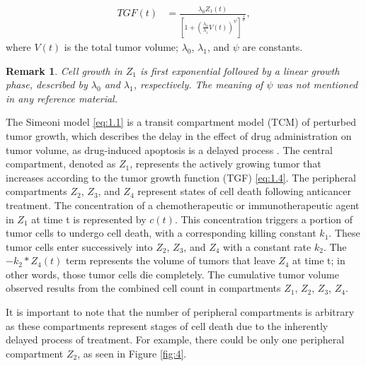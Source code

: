 \documentclass[11pt,reqno]{amsart}
\newtheorem*{remark}{Remark}
\begin{document}
\begin{equation} \label{eq:1.2}
\begin{aligned}
    TGF(t) &= \frac{\lambda_0Z_1(t)}{[1 + (\frac{\lambda_0}{\lambda_1}V(t))^\psi]^\frac{1}{\psi}}, 
\end{aligned}
\tag*{(1.2)}
\end{equation}
\qquad where $V(t)$ is the total tumor volume; $\lambda_0$, $\lambda_1$, and $\psi$ are constants. 
\begin{remark}
     Cell growth in $Z_1$ is ﬁrst exponential followed by a linear growth phase, described by $\lambda_0$ and $\lambda_1$, respectively. \cite{tumor} The meaning of $\psi$ was not mentioned in any reference material.
\end{remark}
The Simeoni model \ref{eq:1.1} is a transit compartment model (TCM) of perturbed tumor growth, which describes the delay in the effect of drug administration on tumor volume, as drug-induced apoptosis is a delayed process \cite{byun2022extended}. The central compartment, denoted as $Z_1$, represents the actively growing tumor that increases according to the tumor growth function (TGF) \ref{eq:1.4}. The peripheral compartments $Z_2$, $Z_3$, and $Z_4$ represent states of cell death following anticancer treatment. The concentration of a chemotherapeutic or immunotherapeutic agent in $Z_1$ at time t is represented by $c(t)$. This concentration triggers a portion of tumor cells to undergo cell death, with a corresponding killing constant $k_1$. These tumor cells enter successively into $Z_2$, $Z_3$, and $Z_4$ with a constant rate $k_2$. The $-k_2 * Z_4(t)$ term represents the volume of tumors that leave $Z_4$ at time t; in other words, those tumor cells die completely. The cumulative tumor volume observed results from the combined cell count in compartments $Z_1$, $Z_2$, $Z_3$, $Z_4$.

It is important to note that the number of peripheral compartments is arbitrary as these compartments represent stages of cell death due to the inherently delayed process of treatment. For example, there could be only one peripheral compartment $Z_2$, as seen in Figure \ref{fig:4}.
\end{document}
